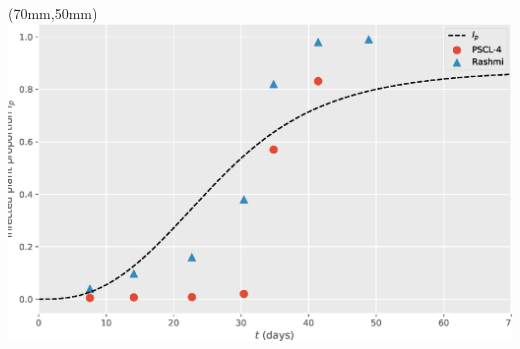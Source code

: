 \documentclass[10pt]{beamer}
\begin{document}
\begin{frame}
	\begin{textblock*}{50mm}(70mm,50mm)
    	\includegraphics[width=\linewidth]{Feathergraphics/Simulation_data.eps}
	\end{textblock*}
\end{frame}
\end{document}
